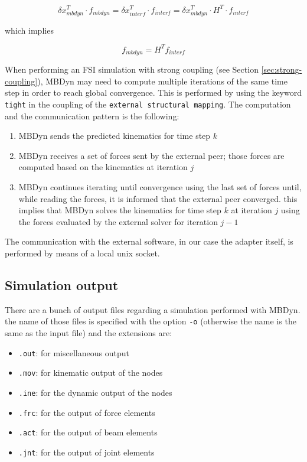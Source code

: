 \begin{equation}
	\delta x_{mbdyn}^T \cdot f_{mbdyn} =  \delta x_{interf}^T \cdot f_{interf} = \delta x_{mbdyn}^T \cdot H^T \cdot f_{interf} 
\end{equation}

which implies

\begin{equation}
	f_{mbdyn} = H^T f_{interf}
\end{equation}

When performing an FSI simulation with strong coupling (see Section \ref{sec:strong-coupling}), MBDyn may need to compute multiple iterations of the same time step in order to reach global convergence. This is performed by using the keyword \texttt{tight} in the coupling of the \texttt{external structural mapping}. The computation and the communication pattern is the following:

\begin{enumerate}
	\item MBDyn sends the predicted kinematics for time step $k$
	\item MBDyn receives a set of forces sent by the external peer; those forces are computed based on the kinematics at iteration $j$
	\item MBDyn continues iterating until convergence using the last set of forces until, while reading the forces, it is informed that the external peer converged. this implies that MBDyn solves the kinematics for time step $k$ at iteration $j$ using the forces evaluated by the external solver for iteration $j-1$ 
\end{enumerate}

The communication with the external software, in our case the adapter itself, is performed by means of a local unix socket.


\subsection{Simulation output}
\label{sec:mbd-output}

There are a bunch of output files regarding a simulation performed with MBDyn. the name of those files is specified with the option \texttt{-o} (otherwise the name is the same as the input file) and the extensions are:

\begin{itemize}
    \item \texttt{.out}: for miscellaneous output
    \item \texttt{.mov}: for kinematic output of the nodes
    \item \texttt{.ine}: for the dynamic output of the nodes
    \item \texttt{.frc}: for the output of force elements
    \item \texttt{.act}: for the output of beam elements
    \item \texttt{.jnt}: for the output of joint elements
\end{itemize}

